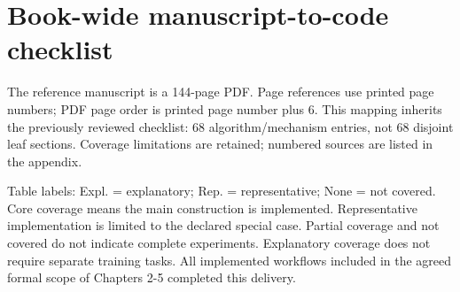\documentclass[a4paper,10pt]{article}
\begin{document}
\section{Book-wide manuscript-to-code checklist}

The reference manuscript is a 144-page PDF. Page references use printed page numbers; PDF page order is printed page number plus 6. This mapping inherits the previously reviewed checklist: 68 algorithm/mechanism entries, not 68 disjoint leaf sections. Coverage limitations are retained; numbered sources are listed in the appendix.

Table labels: Expl. = explanatory; Rep. = representative; None = not covered. Core coverage means the main construction is implemented. Representative implementation is limited to the declared special case. Partial coverage and not covered do not indicate complete experiments. Explanatory coverage does not require separate training tasks. All implemented workflows included in the agreed formal scope of Chapters 2-5 completed this delivery.
\end{document}
